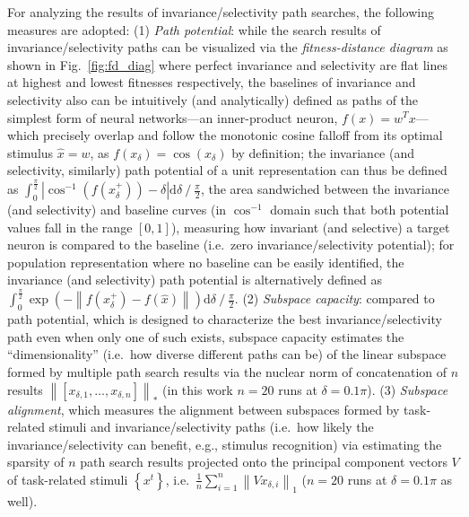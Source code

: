 For analyzing the results of invariance/selectivity path searches, the following measures are adopted: (1) \emph{Path potential}: while the search results of invariance/selectivity paths can be visualized via the \emph{fitness-distance diagram} \cite{jones1995fitness} as shown in Fig.~\ref{fig:fd_diag} where perfect invariance and selectivity are flat lines at highest and lowest fitnesses respectively, the baselines of invariance and selectivity also can be intuitively (and analytically) defined as paths of the simplest form of neural networks---an inner-product neuron, $f(x) = w^{T}x$---which precisely overlap and follow the monotonic cosine falloff from its optimal stimulus $\hat{x}=w$, as $f(x_{\delta}) = \cos(x_{\delta})$ by definition; the invariance (and selectivity, similarly) path potential of a unit representation can thus be defined as $\int_{0}^{\frac{\pi}{2}}{\left| \cos^{-1}\left(f\left( x^{+}_{\delta} \right)\right) - \delta \right|}\mathrm{d}\delta \mathbin{/} {\frac{\pi}{2}}$, the area sandwiched between the invariance (and selectivity) and baseline curves (in $\cos^{-1}$ domain such that both potential values fall in the range $\left[0,1\right]$), measuring how invariant (and selective) a target neuron is compared to the baseline (i.e.~zero invariance/selectivity potential); for population representation where no baseline can be easily identified, the invariance (and selectivity) path potential is alternatively defined as $\int_{0}^{\frac{\pi}{2}}{\exp\left(-\left\|f\left(x^{+}_{\delta}\right)-f\left(\hat{x}\right)\right\|\right)}\mathrm{d}\delta \mathbin{/} {\frac{\pi}{2}}$. (2) \emph{Subspace capacity}: compared to path potential, which is designed to characterize the best invariance/selectivity path even when only one of such exists, subspace capacity estimates the ``dimensionality'' (i.e.~how diverse different paths can be) of the linear subspace formed by multiple path search results via the nuclear norm of concatenation of $n$ results $\left\|\left[x_{\delta,1},\dots,x_{\delta,n}\right]\right\|_{*}$ (in this work $n=20$ runs at $\delta=0.1\pi$). (3) \emph{Subspace alignment}, which measures the alignment between subspaces formed by task-related stimuli and invariance/selectivity paths (i.e.~how likely the invariance/selectivity can benefit, e.g., stimulus recognition) via estimating the sparsity of $n$ path search results projected onto the principal component vectors $V$ of task-related stimuli $\left\lbrace x^{t} \right\rbrace$, i.e.~$\frac{1}{n}\sum_{i=1}^{n} \left\| Vx_{\delta,i} \right\|_{1}$ ($n=20$ runs at $\delta=0.1\pi$ as well). %


